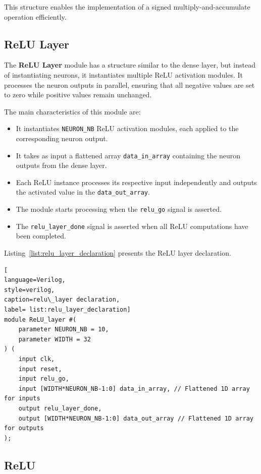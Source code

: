 \documentclass[11pt]{report}
\begin{document}
This structure enables the implementation of a signed multiply-and-accumulate operation efficiently.

\subsection{ReLU Layer}  

The \textbf{ReLU Layer} module has a structure similar to the dense layer, but instead of instantiating neurons, it instantiates multiple ReLU activation modules. It processes the neuron outputs in parallel, ensuring that all negative values are set to zero while positive values remain unchanged.  

The main characteristics of this module are:  

\begin{itemize}
    \item It instantiates \texttt{NEURON\_NB} ReLU activation modules, each applied to the corresponding neuron output.
    \item It takes as input a flattened array \texttt{data\_in\_array} containing the neuron outputs from the dense layer.
    \item Each ReLU instance processes its respective input independently and outputs the activated value in the \texttt{data\_out\_array}.
    \item The module starts processing when the \texttt{relu\_go} signal is asserted.
    \item The \texttt{relu\_layer\_done} signal is asserted when all ReLU computations have been completed.
\end{itemize}  

Listing~\ref{list:relu_layer_declaration} presents the ReLU layer declaration.

\begin{lstlisting}[
language=Verilog,
style=verilog,
caption=relu\_layer declaration,
label= list:relu_layer_declaration]
module ReLU_layer #(
    parameter NEURON_NB = 10,  
    parameter WIDTH = 32
) (
    input clk,
    input reset,
    input relu_go,
    input [WIDTH*NEURON_NB-1:0] data_in_array, // Flattened 1D array for inputs
    output relu_layer_done,
    output [WIDTH*NEURON_NB-1:0] data_out_array // Flattened 1D array for outputs
);    
\end{lstlisting}

\subsection{ReLU}  
\end{document}
